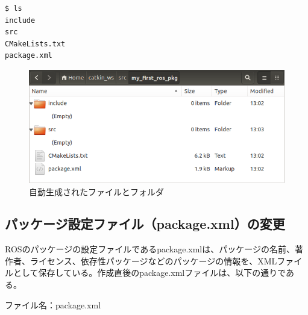 \begin{lstlisting}[language=ROS]
$ ls
include
src
CMakeLists.txt
package.xml
\end{lstlisting}

\begin{figure}[h]
  \centering
  \includegraphics[width=\columnwidth]{pictures/chapter3/pic_03_17.png}
  \caption{自動生成されたファイルとフォルダ}
\end{figure}

 \subsection{パッケージ設定ファイル（package.xml）の変更}
ROSのパッケージの設定ファイルであるpackage.xmlは、パッケージの名前、著作者、ライセンス、依存性パッケージなどのパッケージの情報を、XMLファイルとして保存している。作成直後のpackage.xmlファイルは、以下の通りである。

ファイル名：package.xml

